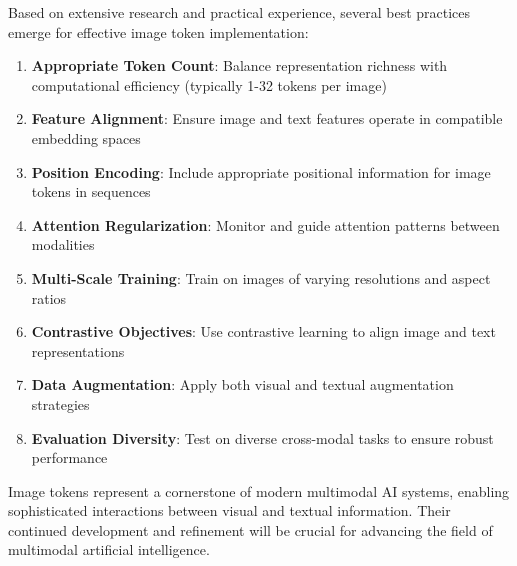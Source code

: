 Based on extensive research and practical experience, several best practices emerge for effective image token implementation:

\begin{enumerate}
\item \textbf{Appropriate Token Count}: Balance representation richness with computational efficiency (typically 1-32 tokens per image)
\item \textbf{Feature Alignment}: Ensure image and text features operate in compatible embedding spaces
\item \textbf{Position Encoding}: Include appropriate positional information for image tokens in sequences
\item \textbf{Attention Regularization}: Monitor and guide attention patterns between modalities
\item \textbf{Multi-Scale Training}: Train on images of varying resolutions and aspect ratios
\item \textbf{Contrastive Objectives}: Use contrastive learning to align image and text representations
\item \textbf{Data Augmentation}: Apply both visual and textual augmentation strategies
\item \textbf{Evaluation Diversity}: Test on diverse cross-modal tasks to ensure robust performance
\end{enumerate}

Image tokens represent a cornerstone of modern multimodal AI systems, enabling sophisticated interactions between visual and textual information. Their continued development and refinement will be crucial for advancing the field of multimodal artificial intelligence.
